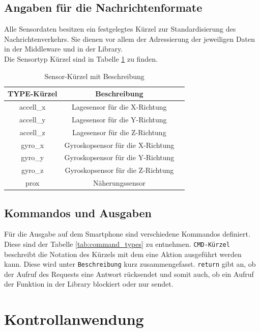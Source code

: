 \documentclass[11pt,a4paper]{report}
\begin{document}
\section{Angaben für die Nachrichtenformate}
Alle Sensordaten besitzen ein festgelegtes Kürzel zur Standardisierung des Nachrichtenverkehrs.
Sie dienen vor allem der Adressierung der jeweiligen Daten in der Middleware und in der Library.
\\
Die Sensortyp Kürzel sind in Tabelle \ref{tab:sensor_types} zu finden. 
\begin{table}[htbp]
  \centering
  \begin{tabular}{|c|c|c}
      \hline
      TYPE-Kürzel & Beschreibung \\
      \hline
      accell\_x & Lagesensor für die X-Richtung \\
      \hline
      accell\_y & Lagesensor für die Y-Richtung \\
      \hline
      accell\_z & Lagesensor für die Z-Richtung \\
      \hline
       gyro\_x & Gyroskopsensor für die X-Richtung \\
      \hline
      gyro\_y & Gyroskopsensor für die Y-Richtung \\
      \hline
      gyro\_z & Gyroskopsensor für die Z-Richtung \\
      \hline
      prox & Näherungssensor \\
      \hline

  \end{tabular}
  \caption{Sensor-Kürzel mit Beschreibung}
  \label{tab:sensor_types}
\end{table}


\section{Kommandos und Ausgaben}
Für die Ausgabe auf dem Smartphone sind verschiedene Kommandos definiert.
Diese sind der Tabelle \ref{tab:command_types} zu entnehmen.
\texttt{CMD-Kürzel} beschreibt die Notation des Kürzels mit dem eine Aktion ausgeführt werden kann.
Diese wird unter \texttt{Beschreibung} kurz zusammengefasst.
\texttt{return} gibt an, ob der Aufruf des Requests eine Antwort rücksendet und somit auch, ob ein Aufruf der Funktion in der Library blockiert oder nur sendet.






\chapter{Kontrollanwendung}\label{chap:server_software}
\end{document}
